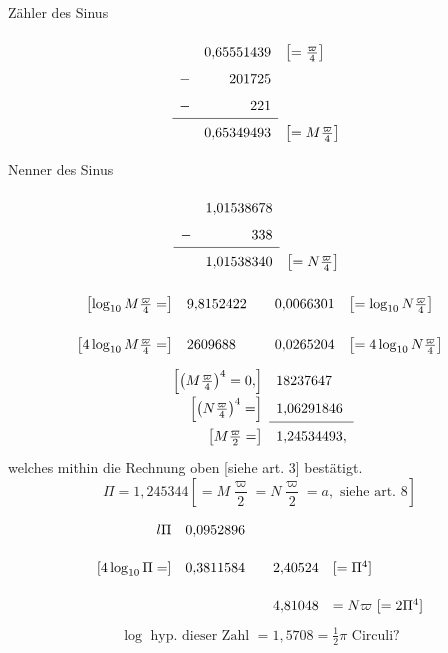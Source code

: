 \noindent\begin{minipage}[t]{.52\linewidth}
\begin{center}Zähler des Sinus\end{center}
\[\renewcommand{\arraystretch}{1.6}\begin{array}{rrl}
&0{,}65551439&\left[=\frac{\varpi}{4}\right]\\
-&201725&\\-&221&\\\cline{1-2}
&0{,}65349493&\left[=M\frac{\varpi}{4}\right]
\end{array}\]
\end{minipage}\hfill\begin{minipage}[t]{.43\linewidth}
\begin{center}Nenner des Sinus\end{center}
\[\renewcommand{\arraystretch}{1.6}\begin{array}{rrl}
&1{,}01538678&\\-&338&\\\cline{1-2}
&1{,}01538340&\left[=N\frac{\varpi}{4}\right]
\end{array}\]
\end{minipage}
{\small\[\begin{array}{rl@{\qquad}rl}
\left[\log_{10}M\frac{\varpi}{4}=\right]&9{,}8152422&0{,}0066301&\left[=\log_{10}N\frac{\varpi}{4}\right]\\[10pt]
\left[4\log_{10}M\frac{\varpi}{4}=\right]&2609688&0{,}0265204&\left[=4\log_{10}N\frac{\varpi}{4}\right]
\end{array}\]}
\[\renewcommand{\arraystretch}{1.6}\begin{array}{rl}
\left[\left(M\frac{\varpi}{4}\right)^4=0{,}\right]&18237647\\
\left[\left(N\frac{\varpi}{4}\right)^4=\right]&1{,}06291846\\\cline{2-2}
\left[M\frac{\varpi}{2}=\right]&1{,}24534493,
\end{array}\]
\noindent welches mithin die  Rechnung oben [siehe art. 3] bestätigt.
\[\Pi=1{,}245344\left[=M\frac{\varpi}{2}=N\frac{\varpi}{2}=a,\text{ siehe art. 8}\right]\]
\[\begin{array}{rl@{\qquad}rl}
l\Pi&0{,}0952896&&\\[8pt]
[4\log_{10}\Pi=]&0{,}3811584&2{,}40524&[=\Pi^4]\\[8pt]
&&4{,}81048&=N\varpi\ [=2\Pi^4]
\end{array}\]
\[\log\text{ hyp. dieser Zahl }=1{,}5708=\tfrac12\pi\text{ Circuli?}\]
\clearpage
